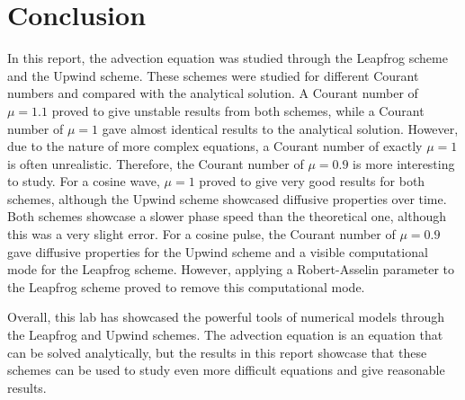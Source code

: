 \section{Conclusion}
In this report, the advection equation was studied through the Leapfrog scheme and the Upwind scheme. These schemes were studied for different Courant numbers and compared with the analytical solution. A Courant number of $\mu=1.1$ proved to give unstable results from both schemes, while a Courant number of $\mu=1$ gave almost identical results to the analytical solution. However, due to the nature of more complex equations, a Courant number of exactly $\mu=1$ is often unrealistic. Therefore, the Courant number of $\mu=0.9$ is more interesting to study. For a cosine wave, $\mu=1$ proved to give very good results for both schemes, although the Upwind scheme showcased diffusive properties over time. Both schemes showcase a slower phase speed than the theoretical one, although this was a very slight error. For a cosine pulse, the Courant number of $\mu=0.9$ gave diffusive properties for the Upwind scheme and a visible computational mode for the Leapfrog scheme. However, applying a Robert-Asselin parameter to the Leapfrog scheme proved to remove this computational mode.

Overall, this lab has showcased the powerful tools of numerical models through the Leapfrog and Upwind schemes. The advection equation is an equation that can be solved analytically, but the results in this report showcase that these schemes can be used to study even more difficult equations and give reasonable results.